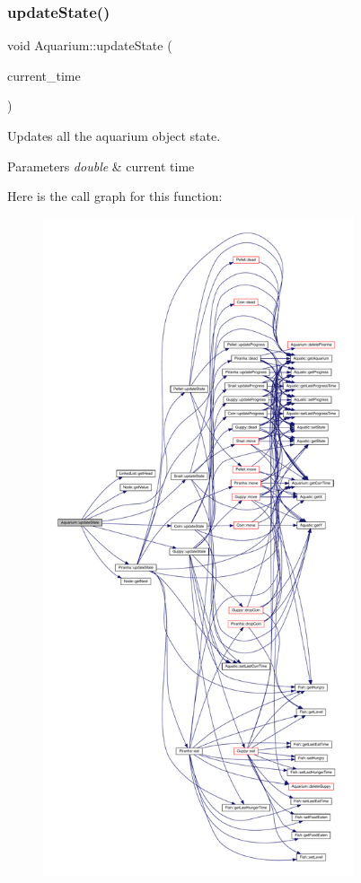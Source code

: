 \subsubsection{\texorpdfstring{update\+State()}{updateState()}}
{\footnotesize\ttfamily void Aquarium\+::update\+State (\begin{DoxyParamCaption}\item[{double}]{current\+\_\+time }\end{DoxyParamCaption})}



Updates all the aquarium object state. 


\begin{DoxyParams}{Parameters}
{\em double} & current time \\
\hline
\end{DoxyParams}
Here is the call graph for this function\+:\nopagebreak
\begin{figure}[H]
\begin{center}
\leavevmode
\includegraphics[height=550pt]{class_aquarium_ac9fc0451e82c808d91a32a2e23e9f18e_cgraph}
\end{center}
\end{figure}
